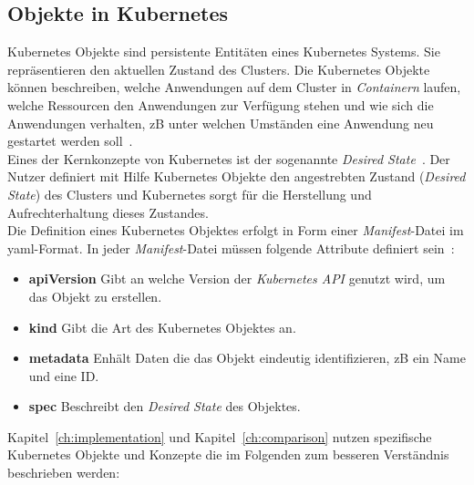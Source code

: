 \subsection{Objekte in Kubernetes}

Kubernetes Objekte sind persistente Entitäten eines Kubernetes Systems. Sie repräsentieren den aktuellen Zustand des Clusters.
Die Kubernetes Objekte können beschreiben, welche Anwendungen auf dem Cluster in \textit{Containern} laufen,
welche Ressourcen den Anwendungen zur Verfügung stehen und
wie sich die Anwendungen verhalten, \ac{zB} unter welchen Umständen eine Anwendung neu gestartet werden soll~\cite{kubernetes-objects}.
\\
Eines der Kernkonzepte von Kubernetes ist der sogenannte \textit{Desired State}~\cite{kubernetes-objects-kodekloud}.
Der Nutzer definiert mit Hilfe Kubernetes Objekte den angestrebten Zustand (\textit{Desired State}) des Clusters und Kubernetes
sorgt für die Herstellung und Aufrechterhaltung dieses Zustandes.
\\
Die Definition eines Kubernetes Objektes erfolgt in Form einer \textit{Manifest}-Datei im \ac{yaml}-Format.
In jeder \textit{Manifest}-Datei müssen folgende Attribute definiert sein~\cite{kubernetes-objects}:

\begin{itemize}
      \setlength\itemsep{-0.5cm}
      \item
            \textbf{apiVersion} Gibt an welche Version der \textit{Kubernetes API} genutzt wird, um das Objekt zu erstellen.
      \item
            \textbf{kind}  Gibt die Art des Kubernetes Objektes an.
      \item
            \textbf{metadata}  Enhält Daten die das Objekt eindeutig identifizieren, \ac{zB} ein Name und eine ID\@.
      \item
            \textbf{spec} Beschreibt den \textit{Desired State} des Objektes.
\end{itemize}

Kapitel~\ref{ch:implementation} und Kapitel~\ref{ch:comparison} nutzen spezifische Kubernetes Objekte und Konzepte die im Folgenden
zum besseren Verständnis beschrieben werden:

